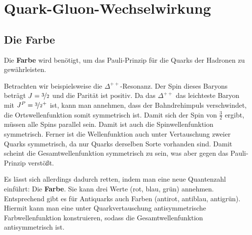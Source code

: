 \section{Quark-Gluon-Wechselwirkung}
\subsection{Die Farbe}
Die \textbf{Farbe} wird benötigt, um das Pauli-Prinzip für die Quarks der Hadronen zu gewährleisten.

Betrachten wir beispielsweise die $\Delta^{++}$-Resonanz.
Der Spin dieses Baryons beträgt $J=\nicefrac{3}{2}$ und die Parität ist positiv.
Da das $\Delta^{++}$ das leichteste Baryon mit $J^P=\nicefrac{3}{2}^+$ ist, kann man annehmen, dass der Bahndrehimpuls verschwindet, die Ortswellenfunktion somit symmetrisch ist.
Damit sich der Spin von $\tfrac{3}{2}$ ergibt, müssen alle Spins parallel sein.
Damit ist auch die Spinwellenfunktion symmetrisch.
Ferner ist die Wellenfunktion auch unter Vertauschung zweier Quarks symmetrisch, da nur Quarks derselben Sorte vorhanden sind.
Damit scheint die Gesamtwellenfunktion symmetrisch zu sein, was aber gegen das Pauli-Prinzip verstößt.

Es lässt sich allerdings dadurch retten, indem man eine neue Quantenzahl einführt: Die \textbf{Farbe}.
Sie kann drei Werte (rot, blau, grün) annehmen.
Entsprechend gibt es für Antiquarks auch Farben (antirot, antiblau, antigrün).
Hiermit kann man eine unter Quarkvertauschung antisymmetrische Farbwellenfunktion konstruieren, sodass die Gesamtwellenfunktion antisymmetrisch ist.
